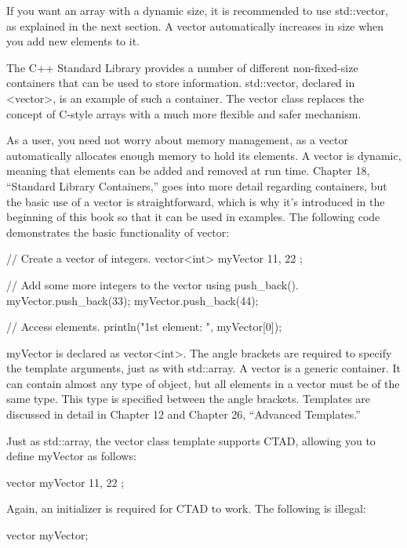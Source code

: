 If you want an array with a dynamic size, it is recommended to use std::vector, as explained in the next section. A vector automatically increases in size when you add new elements to it.


The C++ Standard Library provides a number of different non-fixed-size containers that can be used to store information. std::vector, declared in <vector>, is an example of such a container. The vector class replaces the concept of C-style arrays with a much more flexible and safer mechanism.

As a user, you need not worry about memory management, as a vector automatically allocates enough memory to hold its elements. A vector is dynamic, meaning that elements can be added and removed at run time. Chapter 18, “Standard Library Containers,” goes into more detail regarding containers, but the basic use of a vector is straightforward, which is why it’s introduced in the beginning of this book so that it can be used in examples. The following code demonstrates the basic functionality of vector:

\begin{cpp}
// Create a vector of integers.
vector<int> myVector { 11, 22 };

// Add some more integers to the vector using push_back().
myVector.push_back(33);
myVector.push_back(44);

// Access elements.
println("1st element: {}", myVector[0]);
\end{cpp}

myVector is declared as vector<int>. The angle brackets are required to specify the template arguments, just as with std::array. A vector is a generic container. It can contain almost any type of object, but all elements in a vector must be of the same type. This type is specified between the angle brackets. Templates are discussed in detail in Chapter 12 and Chapter 26, “Advanced Templates.”

Just as std::array, the vector class template supports CTAD, allowing you to define myVector as follows:

\begin{cpp}
vector myVector { 11, 22 };
\end{cpp}

Again, an initializer is required for CTAD to work. The following is illegal:

\begin{cpp}
vector myVector;
\end{cpp}

